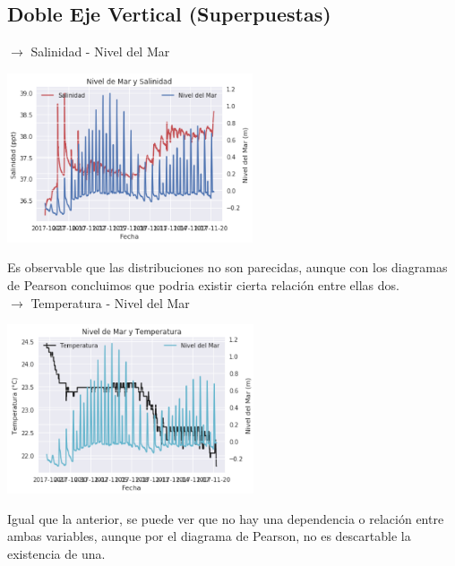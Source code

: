\documentclass[12pt]{article}
\begin{document}
\subsection*{Doble Eje Vertical (Superpuestas)}
$\rightarrow$ Salinidad - Nivel del Mar 
\begin{center}
	\includegraphics[height=5cm]{ge1.png}
\end{center}
Es observable que las distribuciones no son parecidas, aunque con los diagramas de Pearson concluimos que podria existir cierta relación entre ellas dos.\\

$\rightarrow$ Temperatura - Nivel del Mar
\begin{center}
	\includegraphics[height=5cm]{ge2.png}
\end{center}
Igual que la anterior, se puede ver que no hay una dependencia o relación entre ambas variables, aunque por el diagrama de Pearson, no es descartable la existencia de una.
\end{document}
